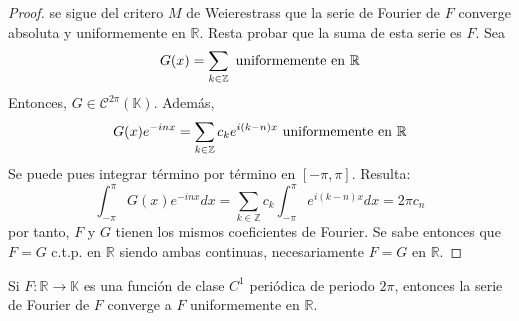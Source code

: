 \documentclass[12pt]{report}
\theoremstyle{largebreak}
\newcommand\cf[3]{\ensuremath{#1:#2\rightarrow#3}}
\begin{document}
\begin{proof}
        se sigue del critero $M$ de Weierestrass que la serie de Fourier de $F$ converge absoluta y uniformemente en $\mathbb{R}$. Resta probar que la suma de esta serie es $F$. Sea
        \begin{equation*}
            G(x)=\sum_{ k\in\mathbb{Z}}\textup{ uniformemente en }\mathbb{R}
        \end{equation*}
        Entonces, $G\in\mathcal{C}^{2\pi}(\mathbb{K})$. Además,
        \begin{equation*}
            G(x)e^{ -inx}=\sum_{ k\in\mathbb{Z}}c_ke^{ i(k-n)x}\textup{ uniformemente en }\mathbb{R}
        \end{equation*}
        Se puede pues integrar término por término en $[-\pi,\pi]$. Resulta:
        \begin{equation*}
            \int_{ -\pi}^\pi G(x)e^{ -inx}dx=\sum_{ k\in\mathbb{Z}}c_k\int_{ -\pi}^\pi e^{ i(k-n)x}dx=2\pi c_n
        \end{equation*}
        por tanto, $F$ y $G$ tienen los mismos coeficientes de Fourier. Se sabe entonces que $F=G$ c.t.p. en $\mathbb{R}$ siendo ambas continuas, necesariamente $F=G$ en $\mathbb{R}$.
    \end{proof}

    \begin{cor}
        Si $\cf{F}{\mathbb{R}}{\mathbb{K}}$ es una función de clase $C^1$ periódica de periodo $2\pi$, entonces la serie de Fourier de $F$ converge a $F$ uniformemente en $\mathbb{R}$.
    \end{cor}
\end{document}
